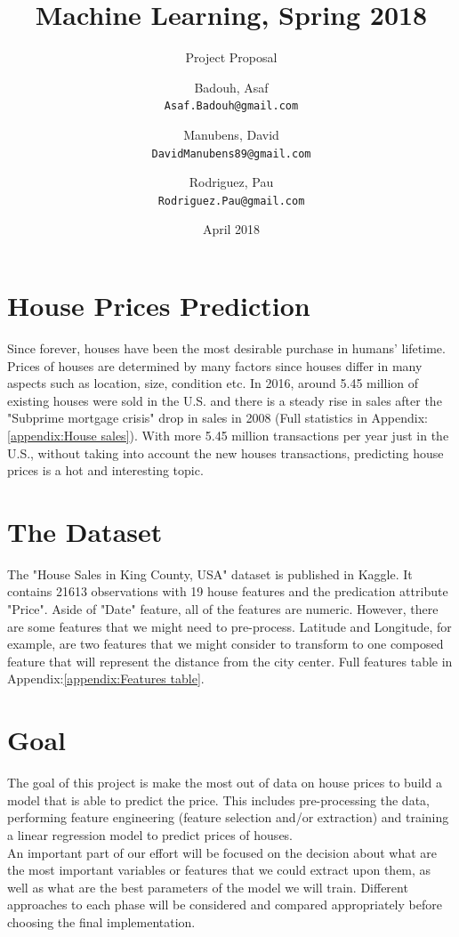 \documentclass{scrartcl}
\title{Machine Learning, Spring 2018}
\subtitle{Project Proposal}
\author{
  Badouh, Asaf\\
  \texttt{Asaf.Badouh@gmail.com}
  \and
  Manubens, David\\
  \texttt{DavidManubens89@gmail.com}
  \and
  Rodriguez, Pau\\
  \texttt{Rodriguez.Pau@gmail.com}
}
\date{April 2018}
\begin{document}
\maketitle
\newpage

\section{House Prices Prediction}
Since forever, houses have been the most desirable purchase in humans' lifetime. Prices of houses are determined by many factors since houses differ in many aspects such as location, size, condition etc. In 2016, around 5.45 million of existing houses were sold in the U.S.\cite{statista} and there is a steady rise in sales after the "Subprime mortgage crisis" drop in sales in 2008 (Full statistics in Appendix:\ref{appendix:House sales}). With more 5.45 million transactions per year just in the U.S., without taking into account the new houses transactions, predicting house prices is a hot and interesting topic.

\section{The Dataset}
The "House Sales in King County, USA" dataset is published in Kaggle\cite{DB}. It contains 21613 observations with 19 house features and the predication attribute "Price".
Aside of "Date" feature, all of the features are numeric. However, there are some features that we might need to pre-process. Latitude and Longitude, for example, are two features that we might consider to transform to one composed feature that will represent the distance from the city center.
Full features table in Appendix:\ref{appendix:Features table}.

\section{Goal}
The goal of this project is make the most out of data on house prices to build a model that is able to predict the price.
This includes pre-processing the data, performing feature engineering (feature selection and/or extraction) and training a linear regression model to predict prices of houses. \\
An important part of our effort will be focused on the decision about what are the most important variables or features that we could extract upon them, as well as what are the best parameters of the model we will train. Different approaches to each phase will be considered and compared appropriately before choosing the final implementation.
\end{document}
